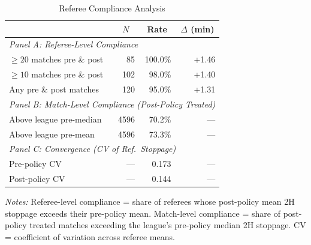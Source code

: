 \begin{table}[htbp]
\centering
\caption{Referee Compliance Analysis}
\label{tab:compliance_v3}
\begin{threeparttable}
\begin{tabular}{lrrr}
\toprule
& \multicolumn{1}{c}{$N$} & \multicolumn{1}{c}{Rate} & \multicolumn{1}{c}{$\Delta$ (min)} \\
\midrule
\multicolumn{4}{l}{\textit{Panel A: Referee-Level Compliance}} \\
  $\geq 20$ matches pre \& post & 85 & 100.0\% & +1.46 \\
  $\geq 10$ matches pre \& post & 102 & 98.0\% & +1.40 \\
  Any pre \& post matches & 120 & 95.0\% & +1.31 \\
\midrule
\multicolumn{4}{l}{\textit{Panel B: Match-Level Compliance (Post-Policy Treated)}} \\
  Above league pre-median & 4596 & 70.2\% & --- \\
  Above league pre-mean & 4596 & 73.3\% & --- \\
\midrule
\multicolumn{4}{l}{\textit{Panel C: Convergence (CV of Ref.\ Stoppage)}} \\
  Pre-policy CV & --- & 0.173 & --- \\
  Post-policy CV & --- & 0.144 & --- \\
\bottomrule
\end{tabular}
\begin{tablenotes}[flushleft]\footnotesize
\item \textit{Notes:} Referee-level compliance = share of referees whose post-policy mean 2H stoppage exceeds their pre-policy mean. Match-level compliance = share of post-policy treated matches exceeding the league's pre-policy median 2H stoppage. CV = coefficient of variation across referee means.
\end{tablenotes}
\end{threeparttable}
\end{table}